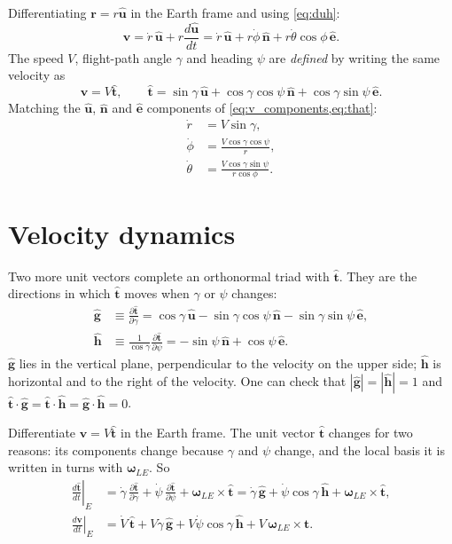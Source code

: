 \documentclass[11pt]{report}
\numberwithin{equation}{chapter}
\newcommand{\uh}{\hat{\mathbf u}}
\newcommand{\eh}{\hat{\mathbf e}}
\newcommand{\nh}{\hat{\mathbf n}}
\newcommand{\tth}{\hat{\mathbf t}}
\newcommand{\gh}{\hat{\mathbf g}}
\newcommand{\hh}{\hat{\mathbf h}}
\newcommand{\vb}[1]{\bm{#1}}
\newcommand{\pd}[2]{\frac{\partial #1}{\partial #2}}
\begin{document}
Differentiating $\vb r = r\uh$ in the Earth frame and using \cref{eq:duh}:
\begin{equation}
  \vb v = \dot r\,\uh + r\frac{d\uh}{dt}
        = \dot r\,\uh + r\dot\phi\,\nh + r\dot\theta\cos\phi\,\eh .
  \label{eq:v_components}
\end{equation}
The speed $V$, flight-path angle $\gamma$ and heading $\psi$ are \emph{defined} by writing the
same velocity as
\begin{equation}
  \vb v = V\tth,\qquad
  \tth = \sin\gamma\,\uh + \cos\gamma\cos\psi\,\nh + \cos\gamma\sin\psi\,\eh .
  \label{eq:that}
\end{equation}
Matching the $\uh$, $\nh$ and $\eh$ components of \cref{eq:v_components,eq:that}:
\begin{align}
  \dot r &= V\sin\gamma, \label{eq:rdot}\\
  \dot\phi &= \frac{V\cos\gamma\cos\psi}{r}, \label{eq:phidot}\\
  \dot\theta &= \frac{V\cos\gamma\sin\psi}{r\cos\phi}. \label{eq:thetadot}
\end{align}

\section{Velocity dynamics}\label{sec:veldyn}

Two more unit vectors complete an orthonormal triad with $\tth$. They are the
directions in which $\tth$ moves when $\gamma$ or $\psi$ changes:
\begin{align}
  \gh &\equiv \pd{\tth}{\gamma} = \cos\gamma\,\uh - \sin\gamma\cos\psi\,\nh - \sin\gamma\sin\psi\,\eh,\\
  \hh &\equiv \frac{1}{\cos\gamma}\pd{\tth}{\psi} = -\sin\psi\,\nh + \cos\psi\,\eh .
\end{align}
$\gh$ lies in the vertical plane, perpendicular to the velocity on the upper side; $\hh$
is horizontal and to the right of the velocity. One can check that
$|\gh|=|\hh|=1$ and $\tth\cdot\gh=\tth\cdot\hh=\gh\cdot\hh=0$.

Differentiate $\vb v = V\tth$ in the Earth frame. The unit vector $\tth$ changes for two
reasons: its components change because $\gamma$ and $\psi$ change, and the local basis it
is written in turns with $\vb\omega_{LE}$. So
\begin{align}
  \left.\frac{d\tth}{dt}\right|_E &= \dot\gamma\,\pd{\tth}{\gamma} + \dot\psi\,\pd{\tth}{\psi}
     + \vb\omega_{LE}\times\tth
   = \dot\gamma\,\gh + \dot\psi\cos\gamma\,\hh + \vb\omega_{LE}\times\tth, \\[4pt]
  \left.\frac{d\vb v}{dt}\right|_E &= \dot V\,\tth + V\dot\gamma\,\gh + V\dot\psi\cos\gamma\,\hh
     + V\,\vb\omega_{LE}\times\tth . \label{eq:dvdt}
\end{align}
\end{document}
